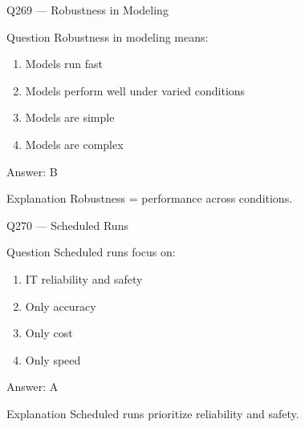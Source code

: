 \documentclass[aspectratio=169,8pt]{beamer}
\begin{document}
								\begin{frame}{Q269 --- Robustness in Modeling}
									\begin{block}{Question}
										Robustness in modeling means:
										\begin{enumerate}
											\item Models run fast
											\item Models perform well under varied conditions
											\item Models are simple
											\item Models are complex
										\end{enumerate}
									\end{block}
									\begin{exampleblock}{Answer: B}\end{exampleblock}
									\begin{block}{Explanation}
										Robustness = performance across conditions.
									\end{block}
								\end{frame}
								
								\begin{frame}{Q270 --- Scheduled Runs}
									\begin{block}{Question}
										Scheduled runs focus on:
										\begin{enumerate}
											\item IT reliability and safety
											\item Only accuracy
											\item Only cost
											\item Only speed
										\end{enumerate}
									\end{block}
									\begin{exampleblock}{Answer: A}\end{exampleblock}
									\begin{block}{Explanation}
										Scheduled runs prioritize reliability and safety.
									\end{block}
								\end{frame}
								
\end{document}
